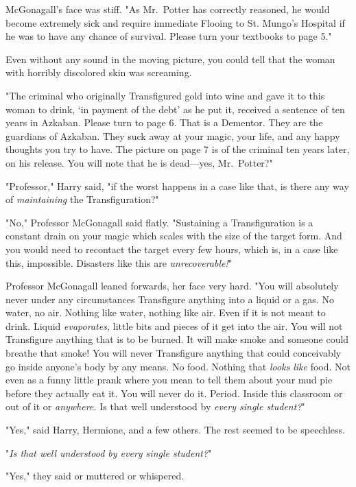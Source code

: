 McGonagall's face was stiff. "As Mr.~Potter has correctly reasoned, he would
become extremely sick and require immediate Flooing to St. Mungo's Hospital if
he was to have any chance of survival. Please turn your textbooks to page 5."

Even without any sound in the moving picture, you could tell that the woman
with horribly discolored skin was screaming.

"The criminal who originally Transfigured gold into wine and gave it to this
woman to drink, `in payment of the debt' as he put it, received a sentence of
ten years in Azkaban. Please turn to page 6. That is a Dementor. They are the
guardians of Azkaban. They suck away at your magic, your life, and any happy
thoughts you try to have. The picture on page 7 is of the criminal ten years
later, on his release. You will note that he is dead—yes, Mr.~Potter?"

"Professor," Harry said, "if the worst happens in a case like that, is there
any way of \emph{maintaining} the Transfiguration?"

"No," Professor McGonagall said flatly. "Sustaining a Transfiguration is a
constant drain on your magic which scales with the size of the target form. And
you would need to recontact the target every few hours, which is, in a case
like this, impossible. Disasters like this are \emph{unrecoverable!}"

Professor McGonagall leaned forwards, her face very hard. "You will absolutely
never under any circumstances Transfigure anything into a liquid or a gas. No
water, no air. Nothing like water, nothing like air. Even if it is not meant to
drink. Liquid \emph{evaporates,} little bits and pieces of it get into the air.
You will not Transfigure anything that is to be burned. It will make smoke and
someone could breathe that smoke! You will never Transfigure anything that
could conceivably go inside anyone's body by any means. No food. Nothing that
\emph{looks like} food. Not even as a funny little prank where you mean to tell
them about your mud pie before they actually eat it. You will never do it.
Period. Inside this classroom or out of it or \emph{anywhere.} Is that well
understood by \emph{every single student?}"

"Yes," said Harry, Hermione, and a few others. The rest seemed to be speechless.

"\emph{Is that well understood by every single student?}"

"Yes," they said or muttered or whispered.

